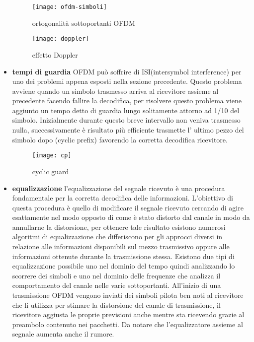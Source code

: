 \begin{itemize}
	 \begin{figure}[h]
	 	\centering
		\begin{minipage}[b]{.5\columnwidth}
	 		\texttt{[image: ofdm-simboli]}
	 		\caption{ortogonalità sottoportanti OFDM \cite{ofdm-simboli}}\label{fig:1}
 		\end{minipage}\hfill
 		\begin{minipage}[b]{.5\columnwidth}
 			\texttt{[image: doppler]}
 			\caption{effetto Doppler \cite{doppler}}\label{fig:1}
 		\end{minipage}\hfill
 	\end{figure}
 	 \item \textbf{tempi di guardia } OFDM può soffrire di ISI(intersymbol interference) per uno dei problemi appena esposti nella sezione precedente. Questo problema avviene quando un simbolo trasmesso arriva al ricevitore assieme al precedente facendo fallire la decodifica, per risolvere questo problema viene aggiunto un tempo detto di guardia lungo solitamente attorno ad 1/10 del simbolo. Inizialmente durante questo breve intervallo non veniva trasmesso nulla, successivamente è risultato più efficiente trasmette l' ultimo pezzo del simbolo dopo (cyclic prefix) favorendo la corretta decodifica  ricevitore.
 	 \begin{figure}[h]
 	 	\centering
 	 	\texttt{[image: cp]}
 	 	\caption{cyclic guard \cite{cp}}\label{fig:1}
 	 \end{figure}
     \item \textbf{equalizzazione} l'equalizzazione del segnale ricevuto è una procedura fondamentale per la corretta decodifica delle informazioni. L'obiettivo di questa procedura è quello di modificare il segnale ricevuto cercando di agire esattamente nel modo opposto di come è stato distorto dal canale in modo da annullarne la distorsione, per ottenere tale risultato esistono numerosi algoritmi di equalizzazione che differiscono per gli approcci diversi in relazione alle informazioni disponibili sul mezzo trasmissivo oppure alle informazioni ottenute durante la trasmissione stessa. Esistono due tipi di equalizzazione possibile uno nel dominio del tempo quindi analizzando lo scorrere dei simboli e uno nel dominio delle frequenze che analizza il comportamento del canale nelle varie sottoportanti. All'inizio di una trasmissione OFDM vengono inviati dei simboli pilota ben noti al ricevitore che li utilizza per stimare la distorsione del canale di trasmissione, il ricevitore aggiusta le proprie previsioni anche mentre sta ricevendo grazie al preambolo contenuto nei pacchetti. Da notare che l'equalizzatore assieme al segnale aumenta anche il rumore.

\end{itemize}
